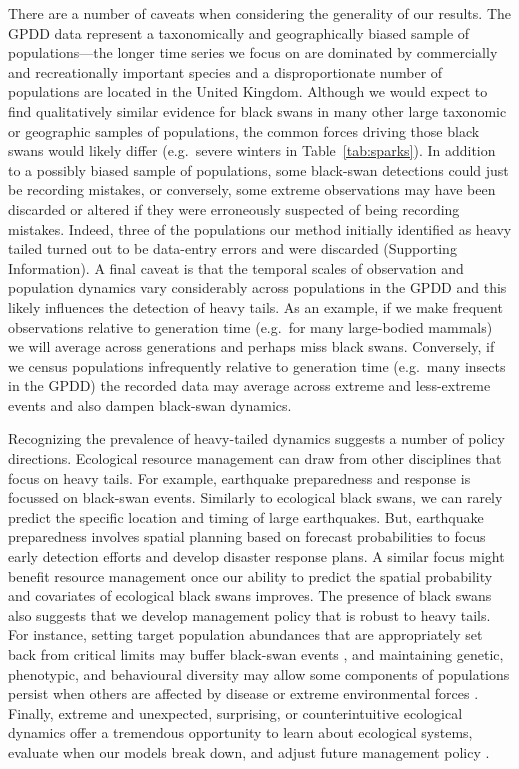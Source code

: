 There are a number of caveats when considering the generality of our results. The GPDD data represent a taxonomically and geographically biased sample of populations---the longer time series we focus on are dominated by commercially and recreationally important species and a disproportionate number of populations are located in the United Kingdom. Although we would expect to find qualitatively similar evidence for black swans in many other large taxonomic or geographic samples of populations, the common forces driving those black swans would likely differ (e.g.~severe winters in Table~\ref{tab:sparks}). In addition to a possibly biased sample of populations, some black-swan detections could just be recording mistakes, or conversely, some extreme observations may have been discarded or altered if they were erroneously suspected of being recording mistakes. Indeed, three of the populations our method initially identified as heavy tailed turned out to be data-entry errors and were discarded (Supporting Information). A final caveat is that the temporal scales of observation and population dynamics vary considerably across populations in the GPDD and this likely influences the detection of heavy tails. As an example, if we make frequent observations relative to generation time (e.g.~for many large-bodied mammals) we will average across generations and perhaps miss black swans. Conversely, if we census populations infrequently relative to generation time (e.g.~many insects in the GPDD) the recorded data may average across extreme and less-extreme events and also dampen black-swan dynamics.

Recognizing the prevalence of heavy-tailed dynamics suggests a number of policy directions. Ecological resource management can draw from other disciplines that focus on heavy tails. For example, earthquake preparedness and response is focussed on black-swan events. Similarly to ecological black swans, we can rarely predict the specific location and timing of large earthquakes. But, earthquake preparedness involves spatial planning based on forecast probabilities to focus early detection efforts and develop disaster response plans. A similar focus might benefit resource management once our ability to predict the spatial probability and covariates of ecological black swans improves. The presence of black swans also suggests that we develop management policy that is robust to heavy tails. For instance, setting target population abundances that are appropriately set back from critical limits may buffer black-swan events \citep[e.g.][]{caddy1996}, and maintaining genetic, phenotypic, and behavioural diversity may allow some components of populations persist when others are affected by disease or extreme environmental forces \citep[e.g.][]{hilborn2003, schindler2010, anderson2014}. Finally, extreme and unexpected, surprising, or counterintuitive ecological dynamics offer a tremendous opportunity to learn about ecological systems, evaluate when our models break down, and adjust future management policy \citep{doak2008, pine-iii2009, lindenmayer2010}.


